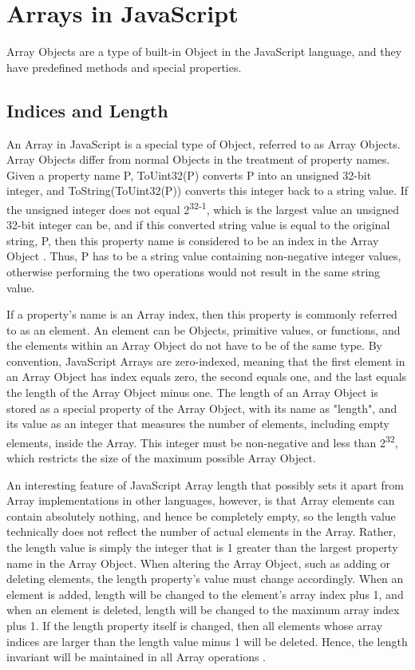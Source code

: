 \documentclass[a4paper,11pt,twoside]{report}
\begin{document}
\chapter{Arrays in JavaScript}
Array Objects are a type of built-in Object in the JavaScript language, and they have predefined methods and special properties. 

\section{Indices and Length}
An Array in JavaScript is a special type of Object, referred to as Array Objects. Array Objects differ from normal Objects in the treatment of property names. Given a property name P, ToUint32(P) converts P into an unsigned 32-bit integer, and ToString(ToUint32(P)) converts this integer back to a string value. If the unsigned integer does not equal 2\textsuperscript{32-1}, which is the largest value an unsigned 32-bit integer can be, and if this converted string value is equal to the original string, P, then this property name is considered to be an index in the Array Object \cite{EcmaScript}. Thus, P has to be a string value containing non-negative integer values, otherwise performing the two operations would not result in the same string value. 

If a property's name is an Array index, then this property is commonly referred to as an element. An element can be Objects, primitive values, or functions, and the elements within an Array Object do not have to be of the same type. By convention, JavaScript Arrays are zero-indexed, meaning that the first element in an Array Object has index equals zero, the second equals one, and the last equals the length of the Array Object minus one. The length of an Array Object is stored as a special property of the Array Object, with its name as "length", and its value as an integer that measures the number of elements, including empty elements, inside the Array. This integer must be non-negative and less than 2\textsuperscript{32}, which restricts the size of the maximum possible Array Object. 

An interesting feature of JavaScript Array length that possibly sets it apart from Array implementations in other languages, however, is that Array elements can contain absolutely nothing, and hence be completely empty, so the length value technically does not reflect the number of actual elements in the Array. Rather, the length value is simply the integer that is 1 greater than the largest property name in the Array Object. When altering the Array Object, such as adding or deleting elements, the length property's value must change accordingly. When an element is added, length will be changed to the element's array index plus 1, and when an element is deleted, length will be changed to the maximum array index plus 1. If the length property itself is changed, then all elements whose array indices are larger than the length value minus 1 will be deleted. Hence, the length invariant will be maintained in all Array operations \cite{EcmaScript}.
\end{document}
